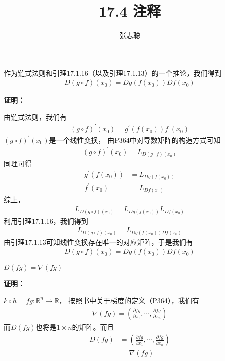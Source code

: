 \documentclass{article}
\begin{document}
\title{17.4 注释}
\author{张志聪}
\maketitle

\begin{zremark}
  作为链式法则和引理17.1.16（以及引理17.1.13）的一个推论，我们得到
  \begin{align*}
    D(g \circ f)(x_0) = Dg(f(x_0)) Df(x_0)
  \end{align*}
\end{zremark}

\textbf{证明：}

由链式法则，我们有
\begin{align*}
  (g \circ f)^\prime(x_0) = g^\prime(f(x_0)) f^\prime(x_0)
\end{align*}
$(g \circ f)^\prime(x_0)$是一个线性变换，
由P364中对导数矩阵的构造方式可知
\begin{align*}
  (g \circ f)^\prime(x_0) = L_{D(g \circ f)(x_0)}
\end{align*}
同理可得
\begin{align*}
  g^\prime(f(x_0)) & = L_{Dg(f(x_0))} \\
  f^\prime(x_0)    & = L_{Df(x_0)}
\end{align*}
综上，
\begin{align*}
  L_{D(g \circ f)(x_0)} = L_{Dg(f(x_0))} L_{Df(x_0)}
\end{align*}
利用引理17.1.16，我们得到
\begin{align*}
  L_{D(g \circ f)(x_0)} = L_{Dg(f(x_0)) Df(x_0)}
\end{align*}
由引理17.1.13可知线性变换存在唯一的对应矩阵，于是我们有
\begin{align*}
  D(g \circ f)(x_0) = Dg(f(x_0)) Df(x_0)
\end{align*}

\begin{zremark}
  $D(fg) = \nabla (fg)$
\end{zremark}

\textbf{证明：}

$k \circ h = fg: \mathbb{R}^n \to \mathbb{R}$，
按照书中关于梯度的定义（P364），我们有
\begin{align*}
  \nabla (fg) = \left(\frac{\partial fg}{\partial x_1}, \cdots, \frac{\partial fg}{\partial x_n}\right)
\end{align*}
而$D(fg)$也将是$1 \times n$的矩阵。而且
\begin{align*}
  D(fg) & = \left(\frac{\partial fg}{\partial x_1}, \cdots, \frac{\partial fg}{\partial x_n}\right) \\
        & = \nabla (fg)
\end{align*}
\end{document}
